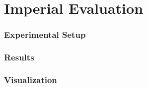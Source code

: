 \part{Imperial Evaluation}

\section{Experimental Setup}

\section{Results}


\section{Visualization}